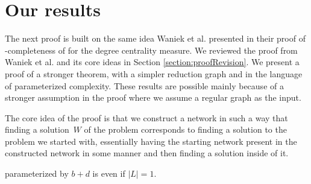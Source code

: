 \section{Our results}\label{section:OurResults}

The next proof is built on the same idea Waniek et al. \cite{Waniek2017} presented in their proof of
\NP-completeness of \HLshort for the degree centrality measure.
We reviewed the proof from Waniek et al. \cite{Waniek2017} and its core ideas in Section \ref{section:proofRevision}.
We present a proof of a stronger theorem, with a simpler reduction graph and in the language of parameterized complexity.
These results are possible mainly because of a stronger assumption in the proof where we assume a regular graph as the input.

The core idea of the proof is that we construct a network in such a way that finding a solution~$W$ of the \HL problem
corresponds to finding a solution to the problem we started with, essentially having the starting network
present in the constructed network in some manner and then finding a solution inside of it.

\begin{theorem}\label{theorem:DB}
    \HL parameterized by $b + d$ is \Wh even if $|L| = 1$.
\end{theorem}

